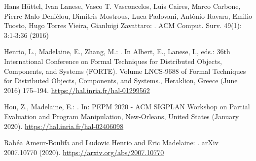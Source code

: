 \documentclass[11pt,fleqn]{article}
\begin{document}
\begin{thebibliography}{9}

Hans H\"uttel, Ivan Lanese, Vasco T. Vasconcelos, Lu\`is Caires, Marco Carbone, Pierre-Malo Deni\'elou, Dimitris Mostrous, Luca Padovani, Ant\`onio Ravara, Emilio Tuosto, Hugo Torres Vieira, Gianluigi Zavattaro:
.
\newblock ACM Comput. Surv. 49(1): 3:1-3:36 (2016)



Henrio, L., Madelaine, E., Zhang, M.:
.
\newblock In Albert, E., Lanese, I., eds.: {36th International Conference on
  Formal Techniques for Distributed Objects, Components, and Systems (FORTE)}.
  Volume LNCS-9688 of Formal Techniques for Distributed Objects, Components,
  and Systems., Heraklion, Greece (June 2016)  175--194. 
\newblock  \url{https://hal.inria.fr/hal-01299562}

Hou, Z., Madelaine, E.:
.
\newblock In: {PEPM 2020 - ACM SIGPLAN Workshop on Partial Evaluation and
  Program Manipulation}, New-Orleans, United States (January 2020). 
 \newblock \url{https://hal.inria.fr/hal-02406098}

Rabéa Ameur-Boulifa and Ludovic Henrio and Eric Madelaine:
.
\newblock arXiv {2007.10770} (2020).
 \newblock \url{https://arxiv.org/abs/2007.10770}
\end{thebibliography}
\end{document}

